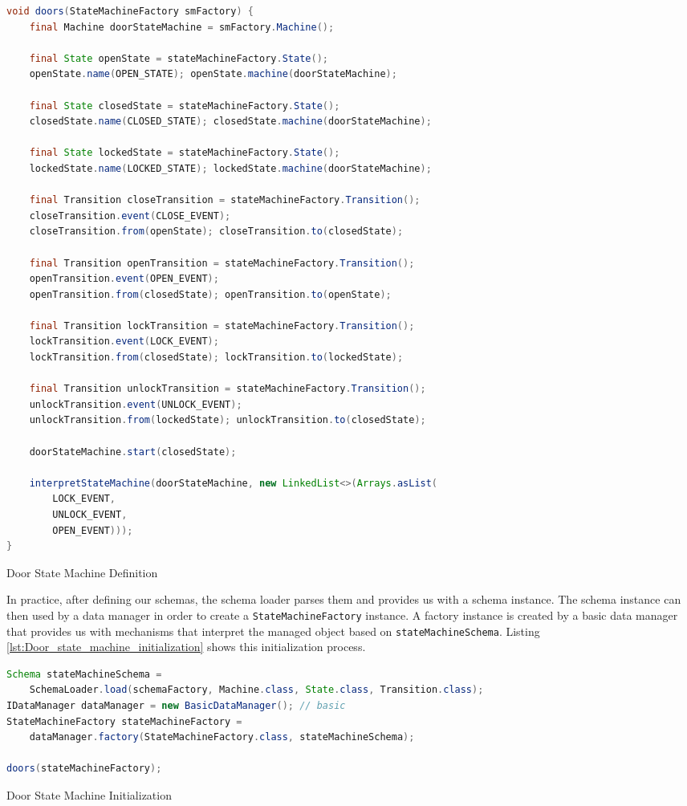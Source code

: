 \begin{sourcecode} [H]
	\begin{lstlisting}[language=Java, escapechar=|]
void doors(StateMachineFactory smFactory) {
	final Machine doorStateMachine = smFactory.Machine();

	final State openState = stateMachineFactory.State();
	openState.name(OPEN_STATE); openState.machine(doorStateMachine);

	final State closedState = stateMachineFactory.State();
	closedState.name(CLOSED_STATE); closedState.machine(doorStateMachine);

	final State lockedState = stateMachineFactory.State();
	lockedState.name(LOCKED_STATE); lockedState.machine(doorStateMachine);

	final Transition closeTransition = stateMachineFactory.Transition();
	closeTransition.event(CLOSE_EVENT);
	closeTransition.from(openState); closeTransition.to(closedState);

	final Transition openTransition = stateMachineFactory.Transition();
	openTransition.event(OPEN_EVENT);
	openTransition.from(closedState); openTransition.to(openState);

	final Transition lockTransition = stateMachineFactory.Transition();
	lockTransition.event(LOCK_EVENT);
	lockTransition.from(closedState); lockTransition.to(lockedState);

	final Transition unlockTransition = stateMachineFactory.Transition();
	unlockTransition.event(UNLOCK_EVENT);
	unlockTransition.from(lockedState); unlockTransition.to(closedState);

	doorStateMachine.start(closedState);

	interpretStateMachine(doorStateMachine, new LinkedList<>(Arrays.asList(
		LOCK_EVENT,
		UNLOCK_EVENT,
		OPEN_EVENT)));
}
	\end{lstlisting}
	\caption{Door State Machine Definition}
	\label{lst:Door_state_machine}
\end{sourcecode}

In practice, after defining our schemas, the schema loader parses them and provides us with a schema instance.
The schema instance can then used by a data manager in order to create a \texttt{StateMachineFactory} instance. 
A factory instance is created by a basic data manager that provides us with mechanisms that interpret the managed object based on \texttt{stateMachineSchema}.
Listing \ref{lst:Door_state_machine_initialization} shows this initialization process.

\begin{sourcecode}
	\begin{lstlisting}[language=Java, escapechar=|]
Schema stateMachineSchema =
	SchemaLoader.load(schemaFactory, Machine.class, State.class, Transition.class);
IDataManager dataManager = new BasicDataManager(); // basic
StateMachineFactory stateMachineFactory = 
	dataManager.factory(StateMachineFactory.class, stateMachineSchema);

doors(stateMachineFactory);
	\end{lstlisting}
	\caption{Door State Machine Initialization}
	\label{lst:Door_state_machine_initialization}
\end{sourcecode}

